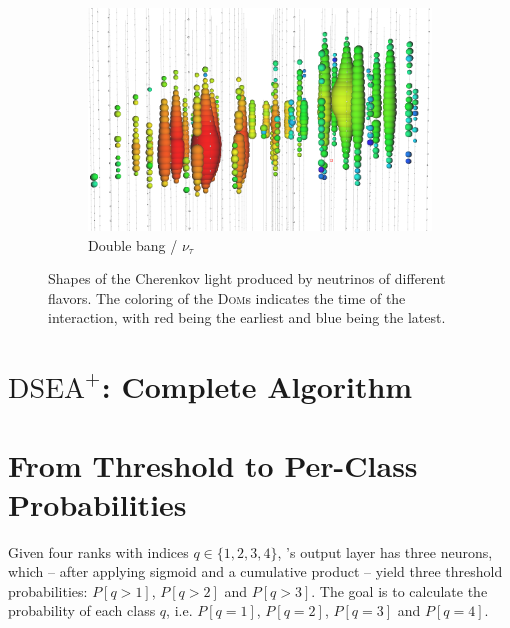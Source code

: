 \begin{figure}
\begin{subfigure}{0.3\textwidth}
    \centering
    \includegraphics[width=\textwidth]{content/img/signatures/double_bang.png}
    \caption{
        Double bang / $\nu_\tau$
    }
  \end{subfigure}
  \caption{
    Shapes of the Cherenkov light produced by neutrinos of different flavors.
    The coloring of the \textsc{Dom}s indicates the time of the interaction,
    with red being the earliest and blue being the latest.
    \cite{kowalski2017} %
  }
  \label{fig:img:icecube:interactions}
\end{figure}


\clearpage
\section{\texorpdfstring{$\text{DSEA}^+$}{DSEA+}: Complete Algorithm} \label{sec:alg:dseaplus}



\clearpage
\section{From Threshold to Per-Class Probabilities}
\label{sec:appendix:corn_probas}
Given four ranks with indices $q \in \{1, 2, 3, 4\}$,
\corn{}'s output layer has three neurons, which
  – after applying sigmoid and a cumulative product –
yield three threshold probabilities:
	$P[q>1]$,
	$P[q>2]$ and
	$P[q>3]$.
The goal is to calculate the probability of each class $q$,
i.e. $P[q=1]$, $P[q=2]$, $P[q=3]$ and $P[q=4]$.

